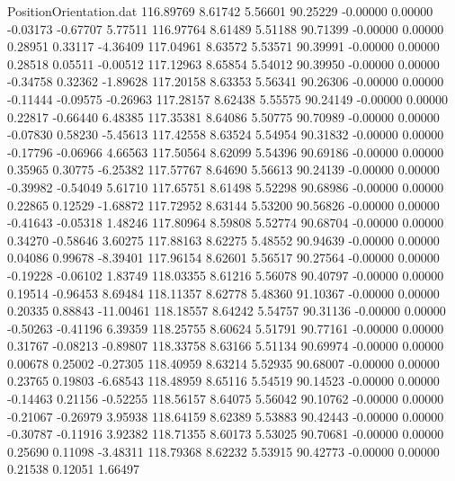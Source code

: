 \begin{filecontents}{PositionOrientation.dat}
 116.89769    8.61742    5.56601    90.25229   -0.00000    0.00000   -0.03173   -0.67707    5.77511
 116.97764    8.61489    5.51188    90.71399   -0.00000    0.00000    0.28951    0.33117   -4.36409
 117.04961    8.63572    5.53571    90.39991   -0.00000    0.00000    0.28518    0.05511   -0.00512
 117.12963    8.65854    5.54012    90.39950   -0.00000    0.00000   -0.34758    0.32362   -1.89628
 117.20158    8.63353    5.56341    90.26306   -0.00000    0.00000   -0.11444   -0.09575   -0.26963
 117.28157    8.62438    5.55575    90.24149   -0.00000    0.00000    0.22817   -0.66440    6.48385
 117.35381    8.64086    5.50775    90.70989   -0.00000    0.00000   -0.07830    0.58230   -5.45613
 117.42558    8.63524    5.54954    90.31832   -0.00000    0.00000   -0.17796   -0.06966    4.66563
 117.50564    8.62099    5.54396    90.69186   -0.00000    0.00000    0.35965    0.30775   -6.25382
 117.57767    8.64690    5.56613    90.24139   -0.00000    0.00000   -0.39982   -0.54049    5.61710
 117.65751    8.61498    5.52298    90.68986   -0.00000    0.00000    0.22865    0.12529   -1.68872
 117.72952    8.63144    5.53200    90.56826   -0.00000    0.00000   -0.41643   -0.05318    1.48246
 117.80964    8.59808    5.52774    90.68704   -0.00000    0.00000    0.34270   -0.58646    3.60275
 117.88163    8.62275    5.48552    90.94639   -0.00000    0.00000    0.04086    0.99678   -8.39401
 117.96154    8.62601    5.56517    90.27564   -0.00000    0.00000   -0.19228   -0.06102    1.83749
 118.03355    8.61216    5.56078    90.40797   -0.00000    0.00000    0.19514   -0.96453    8.69484
 118.11357    8.62778    5.48360    91.10367   -0.00000    0.00000    0.20335    0.88843  -11.00461
 118.18557    8.64242    5.54757    90.31136   -0.00000    0.00000   -0.50263   -0.41196    6.39359
 118.25755    8.60624    5.51791    90.77161   -0.00000    0.00000    0.31767   -0.08213   -0.89807
 118.33758    8.63166    5.51134    90.69974   -0.00000    0.00000    0.00678    0.25002   -0.27305
 118.40959    8.63214    5.52935    90.68007   -0.00000    0.00000    0.23765    0.19803   -6.68543
 118.48959    8.65116    5.54519    90.14523   -0.00000    0.00000   -0.14463    0.21156   -0.52255
 118.56157    8.64075    5.56042    90.10762   -0.00000    0.00000   -0.21067   -0.26979    3.95938
 118.64159    8.62389    5.53883    90.42443   -0.00000    0.00000   -0.30787   -0.11916    3.92382
 118.71355    8.60173    5.53025    90.70681   -0.00000    0.00000    0.25690    0.11098   -3.48311
 118.79368    8.62232    5.53915    90.42773   -0.00000    0.00000    0.21538    0.12051    1.66497

\end{filecontents}
